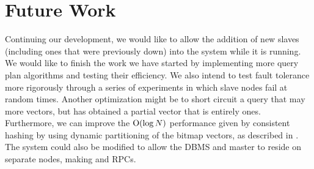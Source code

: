 \section{Future Work}
Continuing our development, we would like to allow the addition of new slaves
(including ones that were previously down) into the system while it is running.
We would like to finish the work we have started by implementing more
query plan algorithms and testing their efficiency. We also intend to test
fault tolerance more rigorously through a series of experiments in which
slave nodes fail at random times. Another optimization might be to short
circuit a query that may  more vectors, but has obtained a partial
vector that is entirely ones. Furthermore, we can improve the
\(\mathrm{O}(\log{N})\) performance given by consistent hashing by using dynamic
partitioning of the bitmap vectors, as described in \cite{kleppman2017}.
The system could also be modified to allow the DBMS and master to reside on separate nodes, making
 and  RPCs.
